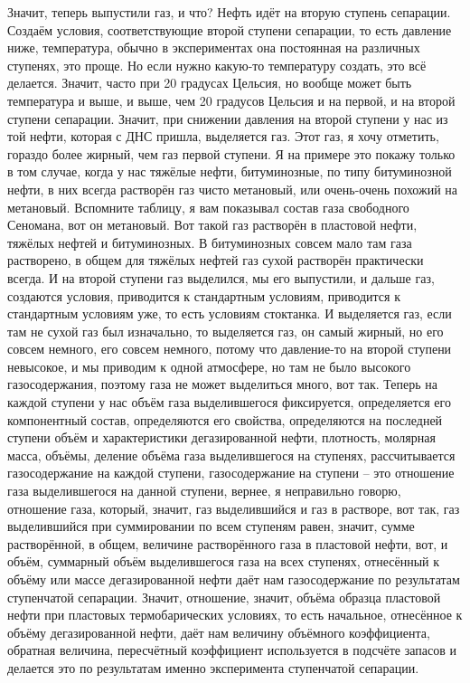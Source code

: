 \documentclass[main.tex]{subfiles}
\begin{document}
Значит, теперь выпустили газ, и что?
Нефть идёт на вторую ступень сепарации.
Создаём условия, соответствующие второй ступени сепарации, то есть давление ниже, температура, обычно в экспериментах она постоянная на различных ступенях, это проще.
Но если нужно какую-то температуру создать, это всё делается.
Значит, часто при 20 градусах Цельсия, но вообще может быть температура и выше, и выше, чем 20 градусов Цельсия и на первой, и на второй ступени сепарации.
Значит, при снижении давления на второй ступени у нас из той нефти, которая с ДНС пришла, выделяется газ.
Этот газ, я хочу отметить, гораздо более жирный, чем газ первой ступени.
Я на примере это покажу только в том случае, когда у нас тяжёлые нефти, битуминозные, по типу битуминозной нефти, в них всегда растворён газ чисто метановый, или очень-очень похожий на метановый.
Вспомните таблицу, я вам показывал состав газа свободного Сеномана, вот он метановый.
Вот такой газ растворён в пластовой нефти, тяжёлых нефтей и битуминозных.
В битуминозных совсем мало там газа растворено, в общем для тяжёлых нефтей газ сухой растворён практически всегда.
И на второй ступени газ выделился, мы его выпустили, и дальше газ, создаются условия, приводится к стандартным условиям, приводится к стандартным условиям уже, то есть условиям стоктанка.
И выделяется газ, если там не сухой газ был изначально, то выделяется газ, он самый жирный, но его совсем немного, его совсем немного, потому что давление-то на второй ступени невысокое, и мы приводим к одной атмосфере, но там не было высокого газосодержания, поэтому газа не может выделиться много, вот так.
Теперь на каждой ступени у нас объём газа выделившегося фиксируется, определяется его компонентный состав, определяются его свойства, определяются на последней ступени объём и характеристики дегазированной нефти, плотность, молярная масса, объёмы, деление объёма газа выделившегося на ступенях, рассчитывается газосодержание на каждой ступени, газосодержание на ступени -- это отношение газа выделившегося на данной ступени, вернее, я неправильно говорю, отношение газа, который, значит, газ выделившийся и газ в растворе, вот так, газ выделившийся при суммировании по всем ступеням равен, значит, сумме растворённой, в общем, величине растворённого газа в пластовой нефти, вот, и объём, суммарный объём выделившегося газа на всех ступенях, отнесённый к объёму или массе дегазированной нефти даёт нам газосодержание по результатам ступенчатой сепарации.
Значит, отношение, значит, объёма образца пластовой нефти при пластовых термобарических условиях, то есть начальное, отнесённое к объёму дегазированной нефти, даёт нам величину объёмного коэффициента, обратная величина, пересчётный коэффициент используется в подсчёте запасов и делается это по результатам именно эксперимента ступенчатой сепарации.
\end{document}
